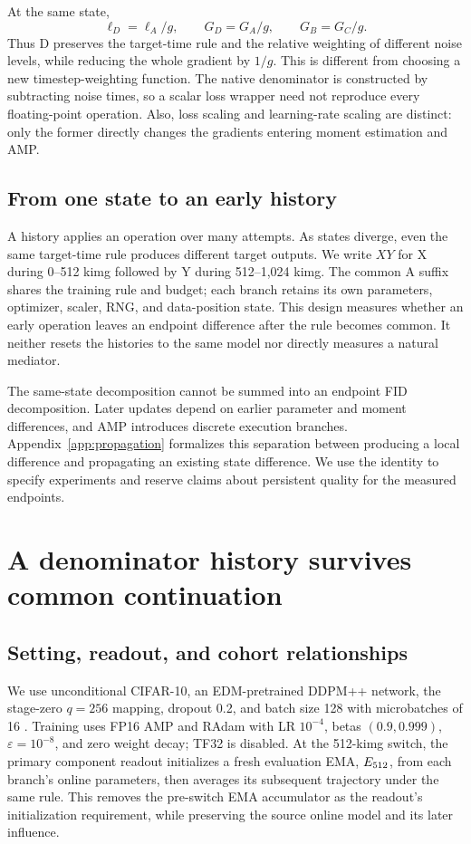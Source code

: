 At the same state,
\begin{equation}
 \ell_D=\ell_A/g,\qquad G_D=G_A/g,\qquad G_B=G_C/g.
 \label{eq:scale}
\end{equation}
Thus D preserves the target-time rule and the relative weighting of different noise levels, while reducing the whole gradient by $1/g$. This is different from choosing a new timestep-weighting function. The native denominator is constructed by subtracting noise times, so a scalar loss wrapper need not reproduce every floating-point operation. Also, loss scaling and learning-rate scaling are distinct: only the former directly changes the gradients entering moment estimation and AMP.

\subsection{From one state to an early history}
A history applies an operation over many attempts. As states diverge, even the same target-time rule produces different target outputs. We write $XY$ for X during 0--512 kimg followed by Y during 512--1,024 kimg. The common A suffix shares the training rule and budget; each branch retains its own parameters, optimizer, scaler, RNG, and data-position state. This design measures whether an early operation leaves an endpoint difference after the rule becomes common. It neither resets the histories to the same model nor directly measures a natural mediator.

The same-state decomposition cannot be summed into an endpoint FID decomposition. Later updates depend on earlier parameter and moment differences, and AMP introduces discrete execution branches. Appendix~\ref{app:propagation} formalizes this separation between producing a local difference and propagating an existing state difference. We use the identity to specify experiments and reserve claims about persistent quality for the measured endpoints.

\section{A denominator history survives common continuation}
\label{sec:history}\label{sec:component}
\subsection{Setting, readout, and cohort relationships}
We use unconditional CIFAR-10, an EDM-pretrained DDPM++ network, the stage-zero $q=256$ mapping, dropout 0.2, and batch size 128 with microbatches of 16 \citep{karras2022edm}. Training uses FP16 AMP and RAdam with LR $10^{-4}$, betas $(0.9,0.999)$, $\varepsilon=10^{-8}$, and zero weight decay; TF32 is disabled. At the 512-kimg switch, the primary component readout initializes a fresh evaluation EMA, $E_{512}$, from each branch's online parameters, then averages its subsequent trajectory under the same rule. This removes the pre-switch EMA accumulator as the readout's initialization requirement, while preserving the source online model and its later influence.


